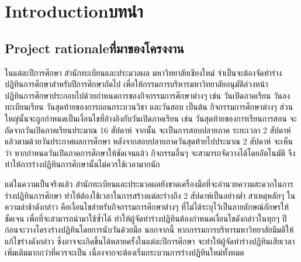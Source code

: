 \chapter{\ifenglish Introduction\else บทนำ\fi}

\section{\ifenglish Project rationale\else ที่มาของโครงงาน\fi}
ในแต่ละปีการศึกษา สำนักทะเบียนและประมวลผล มหาวิทยาลัยเชียงใหม่ จำเป็นจะต้องจัดทำร่างปฏิทินการศึกษาสำหรับปีการศึกษาถัดไป เพื่อให้กรรมการบริหารมหาวิทยาลัยอนุมัติล่วงหน้า \\
%
ปฏิทินการศึกษาประกอบไปด้วยกำหนดการของกิจกรรมการศึกษาต่างๆ เช่น วันเปิดภาคเรียน วันลงทะเบียนเรียน วันสุดท้ายของการถอนกระบวนวิชา และวันสอบ เป็นต้น
%
กิจกรรมการศึกษาต่างๆ ส่วนใหญ่นั้นจะถูกกำหนดเป็นเงื่อนไขที่อ้างอิงกับวันเปิดภาคเรียน เช่น วันสุดท้ายของการเรียนการสอน จะถัดจากวันเปิดภาคเรียนประมาณ 16 สัปดาห์ จากนั้น จะเป็นการสอบปลายภาค ระยะเวลา 2 สัปดาห์ แล้วตามด้วยวันประกาศผลการศึกษา หลังจากสอบปลายภาควันสุดท้ายไปประมาณ 2 สัปดาห์
%
จะเห็นว่า หากกำหนดวันเปิดภาคการศึกษาให้ชัดเจนแล้ว กิจกรรมอื่นๆ จะสามารถจัดวางได้โดยอัตโนมัติ จึงทำให้การร่างปฏิทินการศึกษานั้นไม่ควรใช้เวลามากนัก

แต่ในความเป็นจริงแล้ว สำนักทะเบียนและประมวลผลยังขาดเครื่องมือที่จะอำนวยความสะดวกในการร่างปฏิทินการศึกษา ทำให้ต้องใช้เวลาในการสร้างแต่ละร่างถึง 2 สัปดาห์เป็นอย่างต่ำ
%
สาเหตุหลักๆ ในความล่าช้าดังกล่าว คือเงื่อนไขสำหรับกิจกรรมการศึกษาต่างๆ ที่ไม่ได้ระบุไว้เป็นลายลักษณ์อักษรให้ชัดเจน เพื่อที่จะสามารถนำมาใช้ซ้ำได้ ทำให้ผู้จัดทำร่างปฏิทินต้องกำหนดเงื่อนไขดังกล่าวในทุกๆ ปี ก่อนจะวางโครงร่างปฏิทินโดยการนับวันด้วยมือ
%
นอกจากนี้ หากกรรมการบริหารมหาวิทยาลัยมีมติให้แก้ไขร่างดังกล่าว ซึ่งอาจจะเกิดขึ้นได้หลายครั้งในแต่ละปีการศึกษา จะทำให้ผู้จัดทำร่างปฏิทินเสียเวลาเพิ่มเติมมากกว่าที่ควรจะเป็น เนื่องจากจะต้องเริ่มกระบวนการร่างปฏิทินใหม่ทั้งหมด




